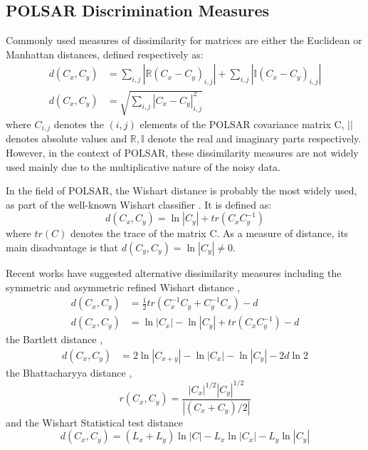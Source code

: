 \documentclass[journal]{IEEEtran}
\begin{document}
\subsection{POLSAR Discrimination Measures}
\label{sec:lit_measures}

Commonly used measures of dissimilarity for matrices are either the Euclidean or Manhattan distances, defined respectively as:
\begin{align}
  d(C_x,C_y) &= \sum_{i,j} |\mathbb{R} (C_x - C_y)_{i,j}| + \sum_{i,j} |\mathbb{I} (C_x - C_y)_{i,j}| \\
  d(C_x,C_y) &= \sqrt{\sum_{i,j} |C_x - C_y|_{i,j}^2 }
\end{align}
where $C_{i,j}$ denotes the $(i,j)$ elements of the POLSAR covariance matrix C,
 $||$ denotes absolute values
and $\mathbb{R},\mathbb{I}$ denote the real and imaginary parts respectively.
However, in the context of POLSAR, %
  these dissimilarity measures are not widely used 
  mainly due to the multiplicative nature of the noisy data.

In the field of POLSAR, the Wishart distance is probably the most widely used, as part of the well-known Wishart classifier \cite{Lee_1999_TGRS}.
It is defined \cite{Lee_1994_IJRS_2299} as:
\begin{equation}
  d(C_x,C_y) = \ln|C_y| + tr(C_xC_y^{-1})
\end{equation}
where $tr(C)$ denotes the trace of the matrix C. 
As a measure of distance, its main disadvantage is that $d(C_y,C_y) = \ln|C_y| \neq 0$.

Recent works have suggested alternative dissimilarity measures including the symmetric and asymmetric refined Wishart distance \cite{Anfinsen_2007_ESA_POLINSAR},
\begin{align}
  d(C_x,C_y) &= \frac{1}{2} tr(C_x^{-1}C_y + C_y^{-1}C_x) - d \\
    d(C_x,C_y) &= \ln|C_x| - \ln|C_y| + tr(C_xC_y^{-1}) - d
\end{align}
the Bartlett distance \cite{Kersten_2005_TGRS_519},
  \begin{align}
  d(C_x,C_y) &= 2 \ln |C_{x+y}| - \ln |C_x| - \ln |C_y| - 2d\ln2
  \end{align}
the Bhattacharyya distance \cite{Lee_2011_IGARSS_3740},
\begin{equation}
  r(C_x,C_y) = \frac{|C_x|^{1/2} |C_y|^{1/2}}{|(C_x+C_y)/2|}
\end{equation}
and the Wishart Statistical test distance \cite{Cao_2007_TGRS_3454}
\begin{equation}
  d(C_x,C_y) = (L_x + L_y) \ln|C| - L_x \ln|C_x| - L_y\ln|C_y|
\end{equation}
\end{document}
